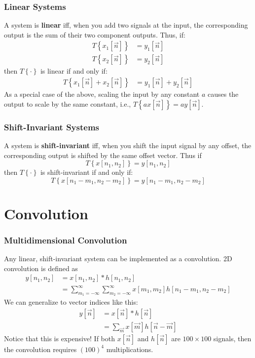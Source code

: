 \documentclass{beamer}
\begin{document}
\begin{frame}
  \frametitle{Linear Systems}

  A system is {\bf linear} iff, when you add two signals at the input,
  the corresponding output is the sum of their two component outputs.  Thus, if:
  \begin{align*}
    T\left\{x_1[\vec{n}]\right\} & = y_1[\vec{n}]\\
    T\left\{x_2[\vec{n}]\right\} & = y_2[\vec{n}]
  \end{align*}
  then $T\left\{\cdot\right\}$ is linear if and only if:
  \begin{align*}
    T\left\{x_1[\vec{n}]+x_2[\vec{n}]\right\} &= y_1[\vec{n}]+y_2[\vec{n}]
  \end{align*}
  As a special case of the above, scaling the input by any constant
  $a$ causes the output to scale by the same constant, i.e.,
  $T\left\{a x[\vec{n}]\right\} = ay[\vec{n}]$.
\end{frame}

\begin{frame}
  \frametitle{Shift-Invariant Systems}

  A system is {\bf shift-invariant} iff, when you shift the input
  signal by any offset, the corresponding output is shifted by the
  same offset vector.  Thus if
  \begin{displaymath}
    T\left\{x[n_1,n_2]\right\} = y[n_1,n_2]
  \end{displaymath}
  then $T\left\{\cdot\right\}$ is shift-invariant if and only if:
  \begin{displaymath}
    T\left\{x[n_1-m_1,n_2-m_2]\right\} = y[n_1-m_1,n_2-m_2]
  \end{displaymath}
\end{frame}


\section[Convolution]{Convolution}
\setcounter{subsection}{1}

\begin{frame}
  \frametitle{Multidimensional Convolution}

  Any linear, shift-invariant system can be implemented as a
  convolution.  2D convolution is defined as
  \begin{align*}
    y[n_1,n_2] &= x[n_1,n_2]\ast h[n_1,n_2]\\
    &= \sum_{m_1=-\infty}^\infty\sum_{m_2=-\infty}^\infty x[m_1,m_2]h[n_1-m_1,n_2-m_2]
  \end{align*}
  We can generalize to vector indices like this:  
  \begin{align*}
    y[\vec{n}] &= x[\vec{n}]\ast h[\vec{n}]\\
    &=\sum_{\vec{m}} x[\vec{m}]h[\vec{n}-\vec{m}]
  \end{align*}
  Notice that this is expensive!  If both $x[\vec{n}]$ and
  $h[\vec{n}]$ are $100\times 100$ signals, then the convolution
  requires $(100)^4$ multiplications.
\end{frame}
\end{document}
